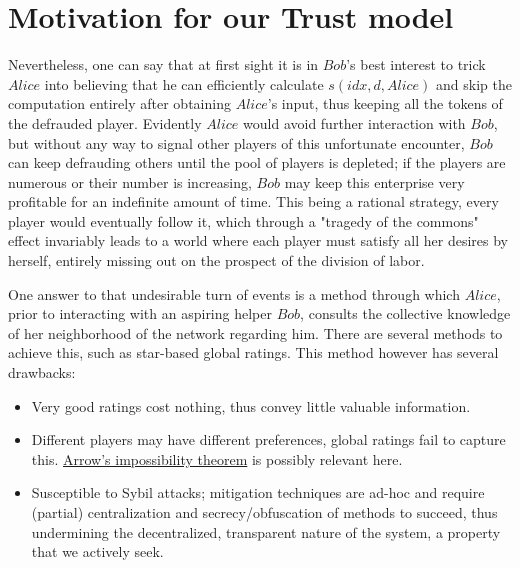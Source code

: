 \section{Motivation for our Trust model}
  Nevertheless, one can say that at first sight it is in $Bob$'s best interest to trick
  $Alice$ into believing that he can efficiently calculate $s\left(idx, d, Alice\right)$
  and skip the computation entirely after obtaining $Alice$'s input, thus keeping all the
  tokens of the defrauded player. Evidently $Alice$ would avoid further interaction with
  $Bob$, but without any way to signal other players of this unfortunate encounter, $Bob$
  can keep defrauding others until the pool of players is depleted; if the players are
  numerous or their number is increasing, $Bob$ may keep this enterprise very profitable
  for an indefinite amount of time. This being a rational strategy, every player would
  eventually follow it, which through a "tragedy of the commons" effect invariably leads
  to a world where each player must satisfy all her desires by herself, entirely missing
  out on the prospect of the division of labor.

  One answer to that undesirable turn of events is a method through which $Alice$, prior
  to interacting with an aspiring helper $Bob$, consults the collective knowledge of her
  neighborhood of the network regarding him. There are several methods to achieve this,
  such as star-based global ratings. This method however has several drawbacks:

  \begin{itemize}
    \item Very good ratings cost nothing, thus convey little valuable information.
    \item Different players may have different preferences, global ratings fail to capture
    this.
    \href{https://en.wikipedia.org/wiki/Arrow\%27s_impossibility_theorem}{Arrow's
    impossibility theorem} is possibly relevant here.
    \item Susceptible to Sybil attacks; mitigation techniques are ad-hoc and require
    (partial) centralization and secrecy/obfuscation of methods to succeed, thus
    undermining the decentralized, transparent nature of the system, a property that we
    actively seek.
  \end{itemize}
